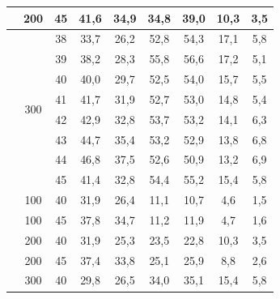 \begin{table}[h]
{\begin{tabular}{ccccccccc}
        	                       &         200          &    45    &    41,6    &    34,9     &    34,8    &    39,0     &    10,3    &     3,5     \\ \midrule
        	\multirow{8}{*}{\CTAB} & \multirow{8}{*}{300} &    38    &    33,7    &    26,2     &    52,8    &    54,3     &    17,1    &     5,8     \\
        	                       &                      &    39    &    38,2    &    28,3     &    55,8    &    56,6     &    17,2    &     5,1     \\
        	                       &                      &    40    &    40,0    &    29,7     &    52,5    &    54,0     &    15,7    &     5,5     \\
        	                       &                      &    41    &    41,7    &    31,9     &    52,7    &    53,0     &    14,8    &     5,4     \\
        	                       &                      &    42    &    42,9    &    32,8     &    53,7    &    53,2     &    14,1    &     6,3     \\
        	                       &                      &    43    &    44,7    &    35,4     &    53,2    &    52,9     &    13,8    &     6,8     \\
        	                       &                      &    44    &    46,8    &    37,5     &    52,6    &    50,9     &    13,2    &     6,9     \\
        	                       &                      &    45    &    41,4    &    32,8     &    54,4    &    55,2     &    15,4    &     5,8     \\ \midrule
        	\multirow{6}{*}{\TTAB} &         100          &    40    &    31,9    &    26,4     &    11,1    &    10,7     &    4,6     &     1,5     \\
        	                       &         100          &    45    &    37,8    &    34,7     &    11,2    &    11,9     &    4,7     &     1,6     \\
        	                       &         200          &    40    &    31,9    &    25,3     &    23,5    &    22,8     &    10,3    &     3,5     \\
        	                       &         200          &    45    &    37,4    &    33,8     &    25,1    &    25,9     &    8,8     &     2,6     \\
        	                       &         300          &    40    &    29,8    &    26,5     &    34,0    &    35,1     &    15,4    &     5,8     \\

\end{tabular}}
\end{table}
